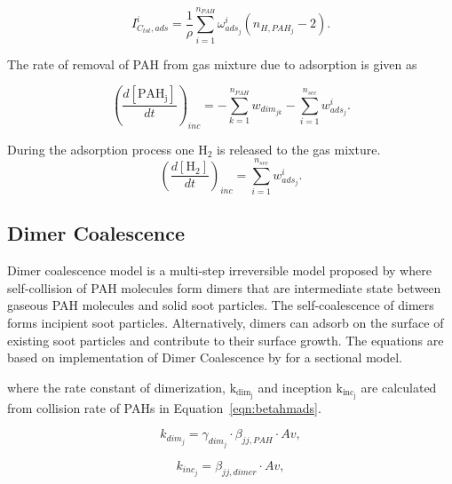 \begin{equation}
	I^i_{C_{tot},ads} =
	\frac{1}{\rho}
	\sum_{i=1}^{n_{PAH}}
	\omega^i_{ads_j}
	\left(n_{H,PAH_j}-2\right)
	\label{eqn:IHtotads_reacdim}.
\end{equation}

The rate of removal of PAH from gas mixture due to adsorption is given as

\begin{equation}
	\left(
	\frac{d\left[{\mathrm{PAH_j}}\right]}{dt}
	\right)_{inc}
	= 
	-\sum_{k=1}^{n_{PAH}}w_{dim_{jk}}-\sum_{i=1}^{n_{sec}}w^i_{ads_j}
	\label{eqn:PAHscrub_reacdim}.
\end{equation}

During the adsorption process one $\mathrm{H_2}$ is released to the gas mixture.
\begin{equation}
	\left(
		\frac{d\left[{\mathrm{H_2}}\right]}{dt}
	\right)_{inc}
	= 
	\sum_{i=1}^{n_{sec}}w^i_{ads_j}
	\label{eqn:H2scrub_reacdim}.
\end{equation}

\subsection{Dimer Coalescence}
Dimer coalescence model is a multi-step irreversible model proposed by \citet{blanquart2009joint} where self-collision of PAH molecules form dimers that are intermediate state between gaseous PAH molecules and solid soot particles. The self-coalescence of dimers forms incipient soot particles. Alternatively, dimers can adsorb on the surface of existing soot particles and contribute to their surface growth. The equations are based on implementation of Dimer Coalescence by \citet{sun2021modelling} for a sectional model.


\noindent where the rate constant of dimerization, $\mathrm{k_{dim_{j}}}$ and inception $\mathrm{k_{inc_{j}}}$ are calculated from collision rate of PAHs in Equation~\eqref{eqn:betahmads}.

\begin{equation}
	k_{dim_{j}}=
	\gamma_{dim_j}\cdot\beta_{jj,PAH}\cdot Av
	\label{eqn:kdim_dimcoal},
\end{equation}

\begin{equation}
	k_{inc_{j}}=
	\beta_{jj,dimer}\cdot Av
	\label{eqn:kinc_dimcoal},
\end{equation}

